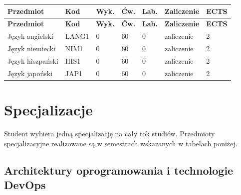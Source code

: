 \documentclass[12pt,a4paper]{article}
\newcommand{\thdrule}{\noalign{\global\setlength{\extrarowheight}{0pt}}}
\newcommand{\thdend}{\noalign{\global\setlength{\extrarowheight}{4pt}}}
\begin{document}
{\scriptsize
\begin{longtable}{m{5.5cm}m{0.8cm}m{1cm}m{1cm}m{1cm}m{1.7cm}m{0.7cm}}
\thdrule\toprule
\rowcolor{pjatkRed}
{\color{white}\footnotesize\textbf{\vphantom{Ag}Przedmiot}} & {\color{white}\footnotesize\textbf{\vphantom{Ag}Kod}} & {\color{white}\footnotesize\textbf{\vphantom{Ag}Wyk.}} & {\color{white}\footnotesize\textbf{\vphantom{Ag}Ćw.}} & {\color{white}\footnotesize\textbf{\vphantom{Ag}Lab.}} & {\color{white}\footnotesize\textbf{\vphantom{Ag}Zaliczenie}} & {\color{white}\footnotesize\textbf{\vphantom{Ag}ECTS}} \\
\midrule\thdend
\endfirsthead
\thdrule\toprule
\rowcolor{pjatkRed}
{\color{white}\footnotesize\textbf{\vphantom{Ag}Przedmiot}} & {\color{white}\footnotesize\textbf{\vphantom{Ag}Kod}} & {\color{white}\footnotesize\textbf{\vphantom{Ag}Wyk.}} & {\color{white}\footnotesize\textbf{\vphantom{Ag}Ćw.}} & {\color{white}\footnotesize\textbf{\vphantom{Ag}Lab.}} & {\color{white}\footnotesize\textbf{\vphantom{Ag}Zaliczenie}} & {\color{white}\footnotesize\textbf{\vphantom{Ag}ECTS}} \\
\midrule\thdend
\endhead
\rowcolor{tableRowLight} Język angielski & LANG1 & 0 & 60 & 0 & {\scriptsize zaliczenie} & 2 \\
\rowcolor{tableRowAlt} Język niemiecki & NIM1 & 0 & 60 & 0 & {\scriptsize zaliczenie} & 2 \\
\rowcolor{tableRowLight} Język hiszpański & HIS1 & 0 & 60 & 0 & {\scriptsize zaliczenie} & 2 \\
\rowcolor{tableRowAlt} Język japoński & JAP1 & 0 & 60 & 0 & {\scriptsize zaliczenie} & 2 \\
\bottomrule
\end{longtable}}



\newpage

\section{Specjalizacje}

Student wybiera jedną specjalizację na cały tok studiów. Przedmioty specjalizacyjne realizowane są w semestrach wskazanych w tabelach poniżej.

\subsection*{Architektury oprogramowania i technologie DevOps}
\end{document}
